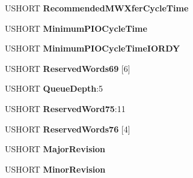 \begin{DoxyCompactItemize}
U\+S\+H\+O\+RT {\bfseries Recommended\+M\+W\+Xfer\+Cycle\+Time}
\item 
\mbox{\label{struct___i_d_e_n_t_i_f_y___d_e_v_i_c_e___d_a_t_a_ac35743fc1701b34b2163343703bd176d}} 
U\+S\+H\+O\+RT {\bfseries Minimum\+P\+I\+O\+Cycle\+Time}
\item 
\mbox{\label{struct___i_d_e_n_t_i_f_y___d_e_v_i_c_e___d_a_t_a_af80ac2e465db37b81609ae8e50c0457e}} 
U\+S\+H\+O\+RT {\bfseries Minimum\+P\+I\+O\+Cycle\+Time\+I\+O\+R\+DY}
\item 
\mbox{\label{struct___i_d_e_n_t_i_f_y___d_e_v_i_c_e___d_a_t_a_a49e52237d9904dd9c2cadf827fa77f96}} 
U\+S\+H\+O\+RT {\bfseries Reserved\+Words69} \mbox{[}6\mbox{]}
\item 
\mbox{\label{struct___i_d_e_n_t_i_f_y___d_e_v_i_c_e___d_a_t_a_a9e28d39ef868474425c72f047b271eed}} 
U\+S\+H\+O\+RT {\bfseries Queue\+Depth}\+:5
\item 
\mbox{\label{struct___i_d_e_n_t_i_f_y___d_e_v_i_c_e___d_a_t_a_a946bbc4596e051c69d82abcaf8444c99}} 
U\+S\+H\+O\+RT {\bfseries Reserved\+Word75}\+:11
\item 
\mbox{\label{struct___i_d_e_n_t_i_f_y___d_e_v_i_c_e___d_a_t_a_a79b2ef46d3c00996118ad21cc620d038}} 
U\+S\+H\+O\+RT {\bfseries Reserved\+Words76} \mbox{[}4\mbox{]}
\item 
\mbox{\label{struct___i_d_e_n_t_i_f_y___d_e_v_i_c_e___d_a_t_a_a136784c220e4ab0fa18827e808c05bee}} 
U\+S\+H\+O\+RT {\bfseries Major\+Revision}
\item 
\mbox{\label{struct___i_d_e_n_t_i_f_y___d_e_v_i_c_e___d_a_t_a_ab92a685dedb22e42100610bd93f63bc8}} 
U\+S\+H\+O\+RT {\bfseries Minor\+Revision}
\item 
\mbox{\label{struct___i_d_e_n_t_i_f_y___d_e_v_i_c_e___d_a_t_a_ab9169b499eba4fb2987ca59b76a5679c}} 

\end{DoxyCompactItemize}
